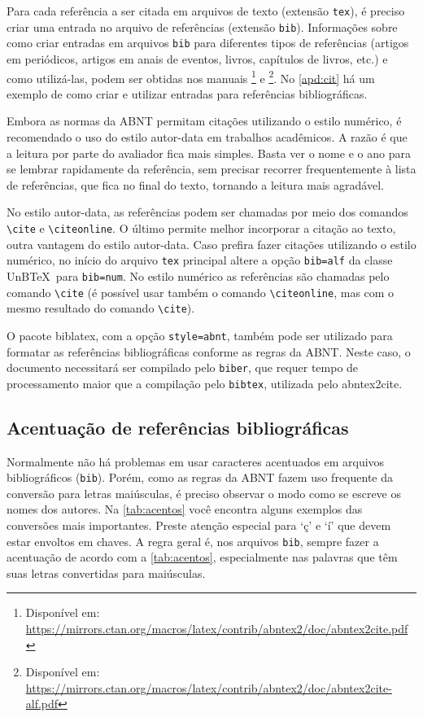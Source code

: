 Para cada referência a ser citada em arquivos de texto (extensão \texttt{tex}), é preciso criar uma entrada no arquivo de referências (extensão \texttt{bib}). Informações sobre como criar entradas em arquivos \texttt{bib} para diferentes tipos de referências (artigos em periódicos, artigos em anais de eventos, livros, capítulos de livros, etc.) e como utilizá-las, podem ser obtidas nos manuais \footnote{Disponível em: \url{https://mirrors.ctan.org/macros/latex/contrib/abntex2/doc/abntex2cite.pdf}} e \footnote{Disponível em: \url{https://mirrors.ctan.org/macros/latex/contrib/abntex2/doc/abntex2cite-alf.pdf}}. No \cref{apd:cit} há um exemplo de como criar e utilizar entradas para referências bibliográficas.

Embora as normas da ABNT permitam citações utilizando o estilo numérico, é recomendado o uso do estilo autor-data em trabalhos acadêmicos. A razão é que a leitura por parte do avaliador fica mais simples. Basta ver o nome e o ano para se lembrar rapidamente da referência, sem precisar recorrer frequentemente à lista de referências, que fica no final do texto, tornando a leitura mais agradável.

No estilo autor-data, as referências podem ser chamadas por meio dos comandos \verb|\cite| e \verb|\citeonline|. O último permite melhor incorporar a citação ao texto, outra vantagem do estilo autor-data. Caso prefira fazer citações utilizando o estilo numérico, no início do arquivo \texttt{tex} principal altere a opção \texttt{bib=alf} da classe UnB\TeX\ para \texttt{bib=num}. No estilo numérico as referências são chamadas pelo comando \verb|\cite| (é possível usar também o comando \verb|\citeonline|, mas com o mesmo resultado do comando \verb|\cite|).

O pacote \textsf{biblatex}, com a opção \texttt{style=abnt}, também pode ser utilizado para formatar as referências bibliográficas conforme as regras da ABNT. Neste caso, o documento necessitará ser compilado pelo \texttt{biber}, que requer tempo de processamento maior que a compilação pelo \texttt{bibtex}, utilizada pelo \textsf{abntex2cite}.

\subsection{Acentuação de referências bibliográficas}

Normalmente não há problemas em usar caracteres acentuados em arquivos bibliográficos (\texttt{bib}). Porém, como as regras da ABNT fazem uso frequente da conversão para letras maiúsculas, é preciso observar o modo como se escreve os nomes dos autores. Na \cref{tab:acentos} você encontra alguns exemplos das conversões mais importantes. Preste atenção especial para `ç' e `í' que devem estar envoltos em chaves. A regra geral é, nos arquivos \texttt{bib}, sempre fazer a acentuação de acordo com a \cref{tab:acentos}, especialmente nas palavras que têm suas letras convertidas para maiúsculas.

